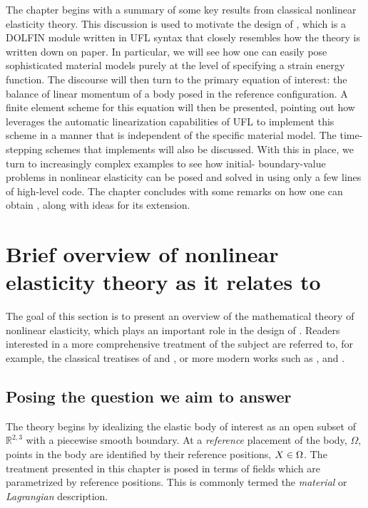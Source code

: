 The chapter begins with a summary of some key results from classical
nonlinear elasticity theory. This discussion is used to motivate the
design of \twist, which is a DOLFIN \citep{LoggWells2010} module
written in UFL syntax \citep{AlnaesLogg2009} that closely resembles
how the theory is written down on paper. In particular, we will see
how one can easily pose sophisticated material models purely at the
level of specifying a strain energy function. The discourse will then
turn to the primary equation of interest: the balance of linear
momentum of a body posed in the reference configuration. A finite
element scheme for this equation will then be presented, pointing out
how \twist{} leverages the automatic linearization capabilities of UFL
to implement this scheme in a manner that is independent of the
specific material model. The time-stepping schemes that \twist{}
implements will also be discussed. With this in place, we turn to
increasingly complex examples to see how initial- boundary-value
problems in nonlinear elasticity can be posed and solved in \twist{}
using only a few lines of high-level code. The chapter concludes with
some remarks on how one can obtain \twist, along with ideas for its
extension.

\section{Brief overview of nonlinear elasticity theory as it relates
to \twist}

The goal of this section is to present an overview of the mathematical
theory of nonlinear elasticity, which plays an important role in the
design of \twist. Readers interested in a more comprehensive treatment
of the subject are referred to, for example, the classical treatises
of \citet{TruesdellToupin1960} and \citet{TruesdellNoll1965}, or more
modern works such as \citet{Gurtin1981}, \citet{Ogden1997} and
\citet{Holzapfel2000}.

\subsection{Posing the question we aim to answer}

The theory begins by idealizing the elastic body of interest as an open
subset of $\mathbb{R}^{2, 3}$ with a piecewise smooth boundary. At a
{\em reference} placement of the body, $\Omega$, points in the body
are identified by their reference positions, $\mbox{$ X$} \in \Omega$. The
treatment presented in this chapter is posed in terms of fields which
are parametrized by reference positions. This is commonly termed the
{\em material} or {\em Lagrangian} description.

